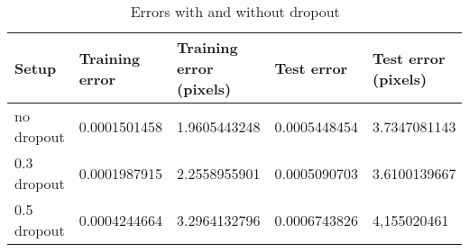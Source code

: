 \begin{table}[h!]
\centering
\footnotesize
\begin{tabular}{|l|l|l|l|l|}
	\hline
		\textbf{Setup} & \textbf{Training error} & \textbf{Training error (pixels)} & \textbf{Test error} & \textbf{Test error (pixels)}\\
	\hline
		no dropout		& 0.0001501458%
						& 1.9605443248%
						& 0.0005448454%
						& 3.7347081143%
						\\
	\hline
		0.3 dropout 	& 0.0001987915%
						& 2.2558955901%
						& 0.0005090703%
						& 3.6100139667%
						\\
	\hline
		0.5 dropout 	& 0.0004244664%
						& 3.2964132796%
						& 0.0006743826%
						& 4,155020461 %
						\\
	\hline
	\end{tabular}
	\normalsize
	\caption{Errors with and without dropout}
	\label{tab:gabor_errors_dropout}
\end{table}
